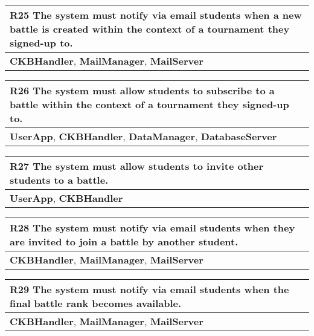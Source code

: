 \begin{table}[H]
    \begin{tabularx}{\textwidth}{X}
        \toprule
        \textbf{R25} The system must notify via email students when a new battle is created within the context of a tournament they signed-up to. \\ \midrule
        \textbf{CKBHandler}, \textbf{MailManager}, \textbf{MailServer} \\    \end{tabularx}
\end{table}

\begin{table}[H]
    \begin{tabularx}{\textwidth}{X}
        \toprule
        \textbf{R26} The system must allow students to subscribe to a battle within the context of a tournament they signed-up to. \\ \midrule
        \textbf{UserApp}, \textbf{CKBHandler}, \textbf{DataManager}, \textbf{DatabaseServer}                    \\
    \end{tabularx}
\end{table}

\begin{table}[H]
    \begin{tabularx}{\textwidth}{X}
        \toprule
        \textbf{R27} The system must allow students to invite other students to a battle. \\ \midrule
        \textbf{UserApp}, \textbf{CKBHandler}                     \\
    \end{tabularx}
\end{table}

\begin{table}[H]
    \begin{tabularx}{\textwidth}{X}
        \toprule
        \textbf{R28} The system must notify via email students when they are invited to join a battle by another student. \\ \midrule
        \textbf{CKBHandler}, \textbf{MailManager}, \textbf{MailServer} \\    
    \end{tabularx}
\end{table}

\begin{table}[H]
    \begin{tabularx}{\textwidth}{X}
        \toprule
        \textbf{R29} The system must notify via email students when the final battle rank becomes available. \\ \midrule
        \textbf{CKBHandler}, \textbf{MailManager}, \textbf{MailServer} \\    
    \end{tabularx}
\end{table}

